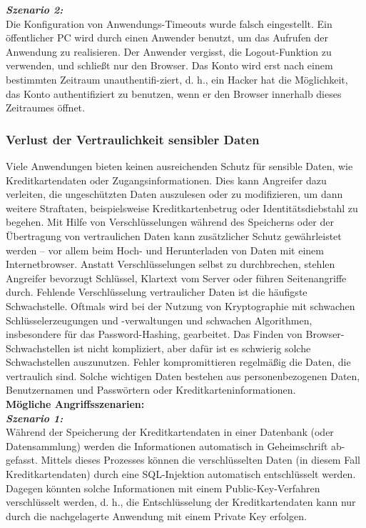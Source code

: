 \textbf{\textit{Szenario 2:}}\\
Die Konfiguration von Anwendungs-Timeouts wurde falsch eingestellt. Ein öffentlicher PC wird durch einen Anwender benutzt, um das Aufrufen der Anwendung zu realisieren. Der Anwender vergisst, die Logout-Funktion zu verwenden, und schließt nur den Browser. Das Konto wird erst nach einem bestimmten Zeitraum unauthentifi-ziert, d. h., ein Hacker hat die Möglichkeit, das Konto authentifiziert zu benutzen, wenn er den Browser innerhalb dieses Zeitraumes öffnet\cite{owasp13top10}.\\

\subsubsection{Verlust der Vertraulichkeit sensibler Daten}

Viele Anwendungen bieten keinen ausreichenden Schutz für sensible Daten, wie Kreditkartendaten oder Zugangsinformationen. Dies kann Angreifer dazu verleiten, die ungeschützten Daten auszulesen oder zu modifizieren, um dann weitere Straftaten, beispielsweise Kreditkartenbetrug oder Identitätsdiebstahl zu begehen. Mit Hilfe von Verschlüsselungen während des Speicherns oder der Übertragung von vertraulichen Daten kann zusätzlicher Schutz gewährleistet werden – vor allem beim Hoch- und Herunterladen von Daten mit einem Internetbrowser. Anstatt Verschlüsselungen selbst zu durchbrechen, stehlen Angreifer bevorzugt Schlüssel, Klartext vom Server oder führen Seitenangriffe durch. Fehlende Verschlüsselung vertraulicher Daten ist die häufigste Schwachstelle. Oftmals wird bei der Nutzung von Kryptographie mit schwachen Schlüsselerzeugungen und -verwaltungen und schwachen Algorithmen, insbesondere für das Password-Hashing, gearbeitet. Das Finden von Browser-Schwachstellen ist nicht kompliziert, aber dafür ist es schwierig solche Schwachstellen auszunutzen. Fehler kompromittieren regelmäßig die Daten, die vertraulich sind. Solche wichtigen Daten bestehen aus personenbezogenen Daten, Benutzernamen und Passwörtern oder  Kreditkarteninformationen\cite{owasp13top10}.\\

\textbf{Mögliche Angriffsszenarien:}\\

\textbf{\textit{Szenario 1:}}\\

Während der Speicherung der Kreditkartendaten in einer Datenbank (oder Datensammlung) werden die Informationen automatisch in Geheimschrift ab-gefasst. Mittels dieses Prozesses können die verschlüsselten Daten (in diesem Fall Kreditkartendaten) durch eine SQL-Injektion automatisch entschlüsselt werden. Dagegen könnten solche Informationen mit einem Public-Key-Verfahren verschlüsselt werden, d. h., die Entschlüsselung der Kreditkartendaten kann nur durch die nachgelagerte Anwendung mit einem Private Key  erfolgen\cite{owasp13top10}.\\

